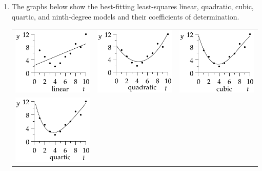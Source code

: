 \begin{exercises}{}{}
\begin{enumerate}
\begin{enumerate}
	    \item The graphs below show the best-fitting least-squares linear, quadratic, cubic, quartic, and ninth-degree models and their coefficients of determination.
	    \begin{center}
	    	\begin{tabular}[t]{@{}c@{\quad}c@{\quad}c@{}}
	    		\includegraphics{midterm-reg1}
					&
	    		\includegraphics{midterm-reg2}
	    		&
	    		\includegraphics{midterm-reg3}
	    		\\
	    		\includegraphics{midterm-reg4}

\end{tabular}
\end{center}
\end{enumerate}
\end{enumerate}
\end{exercises}
